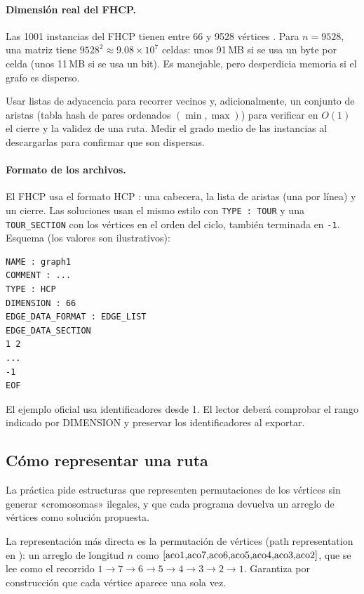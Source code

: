 \paragraph{Dimensión real del FHCP.} Las 1001 instancias del FHCP tienen entre 66 y 9528
vértices \cite{aco8,aco9}. Para $n=9528$, una matriz tiene $9528^2\approx 9.08\times10^7$ celdas:
unos 91\,MB si se usa un byte por celda (unos 11\,MB si se usa un bit). Es manejable, pero
desperdicia memoria si el grafo es disperso.

\prop{} Usar listas de adyacencia para recorrer vecinos y, adicionalmente, un
conjunto de aristas (tabla hash de pares ordenados $(\min,\max)$) para verificar en
$O(1)$ el cierre y la validez de una ruta. \duda{} Medir el grado medio de las instancias
al descargarlas para confirmar que son dispersas.

\paragraph{Formato de los archivos.} El FHCP usa el formato HCP \cite{aco9}: una cabecera, la lista
de aristas (una por línea) y un cierre. Las soluciones usan el mismo estilo con
\texttt{TYPE : TOUR} y una \texttt{TOUR\_SECTION} con los vértices en el orden del ciclo,
también terminada en \texttt{-1}. Esquema (los valores son ilustrativos):
\begin{center}
\begin{minipage}{0.42\textwidth}

\begin{verbatim}
NAME : graph1
COMMENT : ...
TYPE : HCP
DIMENSION : 66
EDGE_DATA_FORMAT : EDGE_LIST
EDGE_DATA_SECTION
1 2
...
-1
EOF
\end{verbatim}
\end{minipage}
\end{center}
El ejemplo oficial usa identificadores desde 1. El lector deberá comprobar el rango indicado por DIMENSION y preservar los identificadores al exportar.\cite{aco9}

\subsection{Cómo representar una ruta}

\req{} La práctica pide estructuras que representen permutaciones de los vértices sin
generar «cromosomas» ilegales, y que cada programa devuelva un arreglo de vértices como
solución propuesta.

\prop{} La representación más directa es la permutación de vértices
(path representation en \cite{aco4}): un arreglo de longitud $n$ como
$\cite{aco1,aco7,aco6,aco5,aco4,aco3,aco2}$, que se lee como el recorrido $1\to7\to6\to5\to4\to3\to2\to1$.
Garantiza por construcción que cada vértice aparece una sola vez.

